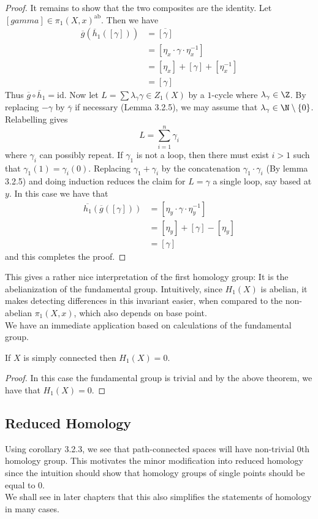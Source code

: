 \documentclass[a4paper]{article}
\begin{document}
\begin{thm}{}{}
\begin{proof}
It remains to show that the two composites are the identity. Let $[gamma]\in\pi_1(X,x)^\text{ab}$. Then we have 
\begin{align*}
\overline{g}(\overline{h}_1([\gamma]))&=\overline{[\gamma]}\\
&=[\eta_x\cdot\gamma\cdot\eta_x^{-1}]\\
&=[\eta_x]+[\gamma]+[\eta_x^{-1}]\\
&=[\gamma]
\end{align*}
Thus $\overline{g}\circ\overline{h}_1=\text{id}$. Now let $L=\sum\lambda_\gamma\gamma\in Z_1(X)$ by a $1$-cycle where $\lambda_\gamma\in\Z$. By replacing $-\gamma$ by $\overline{\gamma}$ if necessary (Lemma 3.2.5), we may assume that $\lambda_\gamma\in\N\setminus\{0\}$. Relabelling gives $$L=\sum_{i=1}^n\gamma_i$$ where $\gamma_i$ can possibly repeat. If $\gamma_1$ is not a loop, then there must exist $i>1$ such that $\gamma_1(1)=\gamma_i(0)$. Replacing $\gamma_1+\gamma_i$ by the concatenation $\gamma_1\cdot\gamma_i$ (By lemma 3.2.5) and doing induction reduces the claim for $L=\gamma$ a single loop, say based at $y$. In this case we have that 
\begin{align*}
\overline{h_1}(\overline{g}([\gamma]))&=[\eta_y\cdot\gamma\cdot\eta_y^{-1}]\\
&=[\eta_y]+[\gamma]-[\eta_y]\\
&=[\gamma]
\end{align*}
and this completes the proof. 
\end{proof}
\end{thm}

This gives a rather nice interpretation of the first homology group: It is the abelianization of the fundamental group. Intuitively, since $H_1(X)$ is abelian, it makes detecting differences in this invariant easier, when compared to the non-abelian $\pi_1(X,x)$, which also depends on base point. \\

We have an immediate application based on calculations of the fundamental group. 

\begin{crl}{}{} If $X$ is simply connected then $H_1(X)=0$. 
\begin{proof}
In this case the fundamental group is trivial and by the above theorem, we have that $H_1(X)=0$. 
\end{proof}
\end{crl}

\subsection{Reduced Homology}
Using corollary 3.2.3, we see that path-connected spaces will have non-trivial $0$th homology group. This motivates the minor modification into reduced homology since the intuition should show that homology groups of single points should be equal to $0$. \\
We shall see in later chapters that this also simplifies the statements of homology in many cases. 
\end{document}

